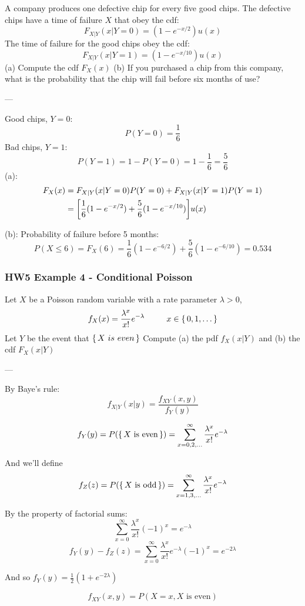 \documentclass{report}
\DeclarePairedDelimiter\autosquarebracket{[}{]}
\newcommand{\sqbr}[1]{\autosquarebracket*{#1}}
\begin{document}
A company produces one defective chip for every five good chips. The defective chips have a time of failure $X$ that obey the cdf: $$F_{X|Y} (x|Y = 0) = (1-e^{-x/2})u(x)$$ The time of failure for the good chips obey the cdf: $$F_{X|Y} (x|Y = 1) = (1-e^{-x/10})u(x)$$ (a) Compute the cdf $F_X(x)$ (b) If you purchased a chip from this company, what is the probability that the chip will fail before six months of use?

---

Good chips, $Y=0$: $$P(Y=0) = \frac{1}{6}$$
Bad chips, $Y=1$: $$P(Y=1) = 1-P(Y=0) = 1-\frac{1}{6} = \frac{5}{6}$$
(a): \begin{align*}
F_X(x) & = F_{X|Y}(x|Y=0)P(Y=0) + F_{X|Y}(x|Y=1)P(Y=1) \\
& = \sqbr{ \frac{1}{6}(1-e^{-x/2}) + \frac{5}{6}(1-e^{-x/10}) } u(x)
\end{align*}

(b): Probability of failure before 5 months: $$P(X \leq 6) = F_X(6) = \frac{1}{6}(1-e^{-6/2}) + \frac{5}{6}(1-e^{-6/10}) = 0.534 $$

\subsubsection*{HW5 Example 4 - Conditional Poisson}

Let $X$ be a Poisson random variable with a rate parameter $\lambda > 0$, $$f_X(x) = \frac{\lambda^x}{x!}e^{-\lambda}\ \ \ \ \ \ \ \ x \in \set{0, 1, \dots} $$
Let $Y$ be the event that $\set{X\ is\ even}$ Compute (a) the pdf $f_X(x|Y)$ and (b) the cdf $F_X(x|Y)$

---

By Baye's rule: $$f_{X|Y}(x|y) = \frac{f_{XY}(x,y)}{f_Y(y)}$$

$$f_Y(y) = P(\set{X \text{ is even}}) = \sum_{x=0,2,\dots}^{\infty} \frac{\lambda^x}{x!}e^{-\lambda}$$ 

And we'll define $$f_Z(z) = P(\set{X \text{ is odd}}) = \sum_{x=1,3,\dots}^{\infty} \frac{\lambda^x}{x!}e^{-\lambda}$$

By the property of factorial sums: $$\sum_{x=0}^\infty \frac{\lambda^x}{x!}(-1)^x = e^{-\lambda}$$
$$f_Y(y) - f_Z(z) = \sum_{x=0}^{\infty} \frac{\lambda^x}{x!} e^{-\lambda} (-1)^x  =  e^{-2 \lambda}$$

And so $f_Y(y) = \frac{1}{2}(1+e^{-2 \lambda})$

$$f_{XY}(x,y) = P(X=x, X \text{ is even})$$
\end{document}
